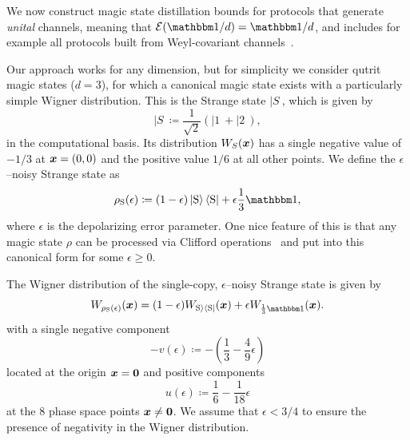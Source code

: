 \documentclass[pra,
aps,
twocolumn,
superscriptaddress,
groupedaddress,
nofootinbib,
reprint
]{revtex4-1}
\begin{document}
We now construct magic state distillation bounds for protocols that generate \emph{unital} channels, meaning that $\E(\I/d) = \I/d$, and includes for example all protocols built from Weyl-covariant channels~\cite{cit:gross3}. 

Our approach works for any dimension, but for simplicity we consider qutrit magic states ($d=3$), for which a canonical magic state exists with a particularly simple Wigner distribution. This is the Strange state $|S\>$, which is given by
\begin{equation}
|S\> \coloneqq \frac{1}{\sqrt{2}} (|1\> + |2\>),
\end{equation}
in the computational basis. Its distribution $W_S(\boldsymbol{x})$ has a single negative value of $-1/3$ at $\boldsymbol{x} =(0,0)$ and the positive value $1/6$ at all other points. We define the $\epsilon$--noisy Strange state as
\begin{equation}\label{eq:noisysn}
    \rho_{\rm{S}}(\epsilon)\coloneqq (1 - \epsilon) \ket{\rm{S}}\bra{\rm{S}} + \epsilon \frac{1}{3}\id,
\end{equation}
where $\epsilon$ is the depolarizing error parameter. One nice feature of this is that any magic state $\rho$ can be processed via Clifford operations~\cite{cit:prakash,cit:prakash2} and put into this canonical form for some $\epsilon \ge 0$.

The Wigner distribution of the single-copy, $\epsilon$--noisy Strange state  is given by
\begin{equation}
	\W[\bmx]{\rho_{\rm{S}}(\epsilon)} = (1-\epsilon)\W[\bmx]{\rm{S}\>\<\rm{S}|} + \epsilon\W[\bmx]{\frac{1}{3}\id}.
\end{equation}
with a single negative component
\begin{equation}
	- v(\epsilon) \coloneqq - \left( \frac{1}{3} -\frac{4}{9}\epsilon \right)
\end{equation} 
located at the origin $\bm{x} = \bm{0}$ and positive components
\begin{equation}
	u(\epsilon) \coloneqq \frac{1}{6} -\frac{1}{18}\epsilon
\end{equation}
at the 8 phase space points $\boldsymbol{x} \ne \mathbf{0}$. We assume that $\epsilon < 3/4$ to ensure the presence of negativity in the Wigner distribution. 
\end{document}
